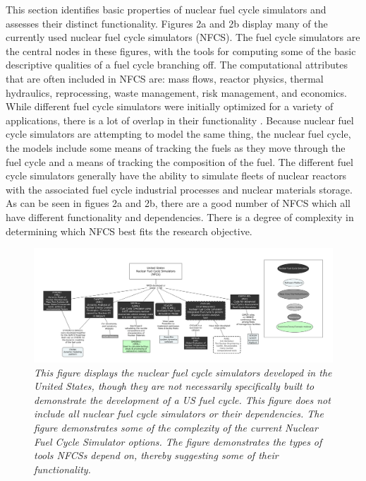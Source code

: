 \documentclass{article}                                                                           %
\begin{document}
\begin{linenumbers}
This section identifies basic properties of nuclear fuel cycle simulators and assesses their distinct functionality. Figures 2a and 2b display many of the currently used nuclear fuel cycle simulators (NFCS). The fuel cycle simulators are the central nodes in these figures, with the tools for computing some of the basic descriptive qualities of a fuel cycle branching off. The computational attributes that are often included in NFCS are: mass flows, reactor physics, thermal hydraulics, reprocessing, waste management, risk management, and economics. While different fuel cycle simulators were initially optimized for a variety of applications, there is a lot of overlap in their functionality \cite {Guerin2009}. Because nuclear fuel cycle simulators are attempting to model the same thing, the nuclear fuel cycle, the models include some means of tracking the fuels as they move through the fuel cycle and a means of tracking the composition of the fuel. The different fuel cycle simulators generally have the ability to simulate fleets of nuclear reactors with the associated fuel cycle industrial processes and nuclear materials storage. As can be seen in figues 2a and 2b, there are a good number of NFCS which all have different functionality and dependencies.  There is a degree of complexity in determining which NFCS best fits the research objective.

\begin{subfigures}
\begin{figure}
\includegraphics[width=\textwidth]{US_FUEL_TOOLS.png}
\caption{\small \sl This figure displays the nuclear fuel cycle simulators developed in the United States, though they are not necessarily specifically built to demonstrate the development of a US fuel cycle. This figure does not include all nuclear fuel cycle simulators or their dependencies.  The figure demonstrates some of the complexity of the current Nuclear Fuel Cycle Simulator options. The figure demonstrates the types of tools NFCSs depend on, thereby suggesting some of their functionality.}
\end{figure}


\end{subfigures}
\end{linenumbers}
\end{document}
